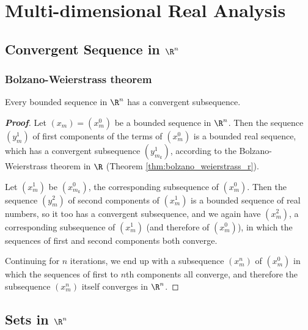 \chapter{Multi-dimensional Real Analysis}

\section{Convergent Sequence in $\R^n$}

\subsection{Bolzano-Weierstrass theorem}

\begin{theorem}\label{thm:bolzano_weierstrass_multiple_real}
Every bounded sequence in $\R^n$ has a convergent subsequence.
\end{theorem}

\begin{proof}[\bf Proof]%
Let $(x_m) = (x_m^0)$ be a bounded sequence in $\R^n$. Then the sequence $(y_m^1)$ of first components of the terms of $(x_m^0)$ is a bounded real sequence, which has a convergent subsequence $(y_{m_k}^1)$, according to the Bolzano-Weierstrass theorem in $\R$ (Theorem \ref{thm:bolzano_weierstrass_r}).
 
Let $(x_{m}^1)$ be $(x_{m_k}^0)$, the corresponding subsequence of $(x_m^0)$. Then the sequence $(y_m^2)$ of second components of $(x_m^1)$ is a bounded sequence of real numbers, so it too has a convergent subsequence, and we again have $(x_{m}^2)$, a corresponding subsequence of $(x_{m}^1)$ (and therefore of $(x_{m}^0)$), in which the sequences of first and second components both converge. 

Continuing for $n$ iterations, we end up with a subsequence $(x_{m}^n)$ of $(x_{m}^0)$ in which the sequences of first to $n$th components all converge, and therefore the subsequence $(x_{m}^n)$ itself converges in $\R^n$.
\end{proof}



\section{Sets in $\R^n$}%





